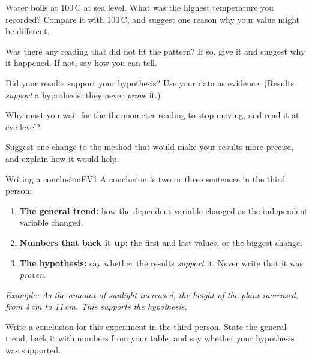 \task Water boils at 100\,\textdegree C at sea level.
What was the highest temperature you recorded?
\answerbox{1cm}
Compare it with 100\,\textdegree C, and suggest one reason why your value might be different.
\answerbox{5cm}

\task Was there any reading that did not fit the pattern? If so, give it and suggest why it happened. If not, say how you can tell.
\answerbox{5cm}

\task Did your results support your hypothesis? Use your data as evidence. (Results \emph{support} a hypothesis; they never \emph{prove} it.)
\answerbox{5cm}

\task Why must you wait for the thermometer reading to stop moving, and read it at eye level?
\answerbox{5cm}

\task Suggest one change to the method that would make your results more precise, and explain how it would help.
\answerbox{5cm}

\begin{technique}{Writing a conclusion}{EV1}
A conclusion is two or three sentences in the third person:
\begin{enumerate}[leftmargin=1.6em, itemsep=1pt, topsep=3pt]
  \item \textbf{The general trend:} how the dependent variable changed as the independent variable changed.
  \item \textbf{Numbers that back it up:} the first and last values, or the biggest change.
  \item \textbf{The hypothesis:} say whether the results \emph{support} it. Never write that it was \emph{proven}.
\end{enumerate}
\emph{Example: As the amount of sunlight increased, the height of the plant increased, from 4\,cm to 11\,cm. This supports the hypothesis.}
\end{technique}

\task Write a conclusion for this experiment in the third person. State the general trend, back it with numbers from your table, and say whether your hypothesis was supported.

\answerbox{5.5cm}

